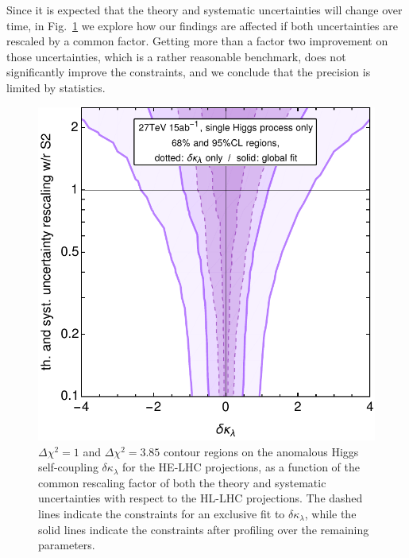 Since it is expected that the theory and systematic uncertainties will change over time, in Fig.~\ref{fig:helhcrescaling} we explore how our findings are affected if both uncertainties are rescaled by a common factor. Getting more than a factor two improvement on those uncertainties, which is a rather reasonable benchmark, does not significantly improve the constraints, and we conclude that the precision is limited by statistics.	

\begin{figure}[h]
	\centering
	\includegraphics[width=0.4\linewidth]{section3/plots/helhcrescaling_S2}
	\caption{$\Delta\chi^2=1$ and $\Delta\chi^2=3.85$ contour regions on the anomalous Higgs self-coupling $\delta \kappa_\lambda$ for the HE-LHC projections, as a function of the common rescaling factor of both the theory and systematic uncertainties with respect to the HL-LHC projections. The dashed lines indicate the constraints for an exclusive fit to $\delta\kappa_\lambda$, while the solid lines indicate the constraints after profiling over the remaining parameters.}
	\label{fig:helhcrescaling}
\end{figure}